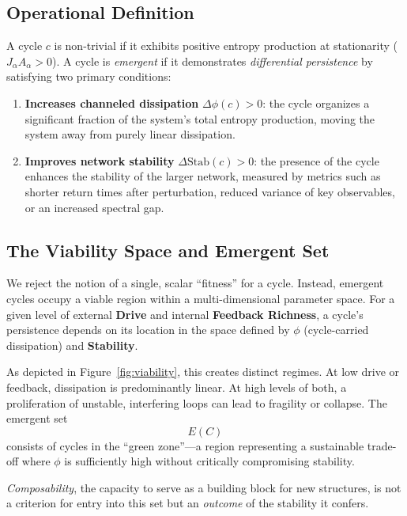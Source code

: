 \documentclass[12pt,a4paper]{article}
\begin{document}
\subsection{Operational Definition}
A cycle $c$ is non-trivial if it exhibits positive entropy production at stationarity ($J_{\alpha} A_{\alpha} > 0$). A cycle is \emph{emergent} if it demonstrates \emph{differential persistence} by satisfying two primary conditions:
\begin{enumerate}
    \item \textbf{Increases channeled dissipation} $\Delta \phi(c) > 0$: the cycle organizes a significant fraction of the system’s total entropy production, moving the system away from purely linear dissipation.
    \item \textbf{Improves network stability} $\Delta \mathrm{Stab}(c) > 0$: the presence of the cycle enhances the stability of the larger network, measured by metrics such as shorter return times after perturbation, reduced variance of key observables, or an increased spectral gap.
\end{enumerate}

\subsection{The Viability Space and Emergent Set}
We reject the notion of a single, scalar ``fitness'' for a cycle. Instead, emergent cycles occupy a viable region within a multi-dimensional parameter space. For a given level of external \textbf{Drive} and internal \textbf{Feedback Richness}, a cycle’s persistence depends on its location in the space defined by $\phi$ (cycle-carried dissipation) and \textbf{Stability}.

As depicted in Figure~\ref{fig:viability}, this creates distinct regimes. At low drive or feedback, dissipation is predominantly linear. At high levels of both, a proliferation of unstable, interfering loops can lead to fragility or collapse. The emergent set
\[
E(C)
\]
consists of cycles in the ``green zone''—a region representing a sustainable trade-off where $\phi$ is sufficiently high without critically compromising stability. 

\emph{Composability}, the capacity to serve as a building block for new structures, is not a criterion for entry into this set but an \emph{outcome} of the stability it confers.
\end{document}

